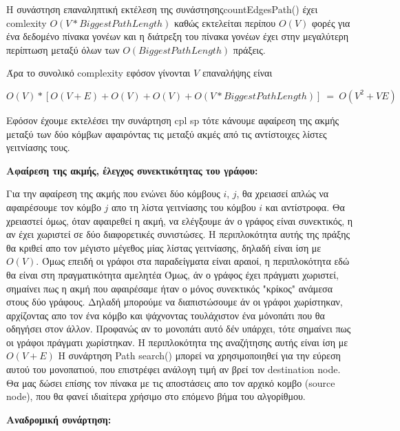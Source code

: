 \documentclass{article}
\begin{document}
Η συνάστηση επαναληπτική εκτέλεση της συνάστησηςcountEdgesPath() έχει comlexity
$O(V*Biggest Path Length)$ καθώς εκτελείται περίπου $Ο(V)$ φορές για ένα δεδομένο πίνακα γονέων και η διάτρεξη του πίνακα γονέων έχει στην μεγαλύτερη περίπτωση μεταξύ όλων των $Ο(Biggest Path Length)$ πράξεις.\bigbreak

Άρα το συνολικό complexity εφόσον γίνονται $V$ επαναλήψης είναι 

$Ο(V) * [O(V+E)+O(V)+O(V)+Ο(V*Biggest Path Length)] \ = \ O(V^2 + VE)$\bigbreak

Eφόσον έχουμε εκτελέσει την συνάρτηση cpl sp τότε κάνουμε αφαίρεση της ακμής μεταξύ των δύο κόμβων αφαιρόντας τις μεταξύ ακμές από τις αντίστοιχες λίστες γειτνίασης τους.\pagebreak

\textbf{Αφαίρεση της ακμής, έλεγχος συνεκτικότητας του γράφου:}\bigbreak

Για την αφαίρεση της ακμής που ενώνει δύο κόμβους $i$, $j$, θα χρειασεί απλώς να αφαιρέσουμε τον κόμβο $j$ απο τη λίστα γειτνίασης του κόμβου $i$ και αντίστροφα.
Θα χρειαστεί όμως, όταν αφαιρεθεί η ακμή, να ελέγξουμε άν ο γράφος είναι συνεκτικός, η αν έχει χωριστεί σε δύο διαφορετικές συνιστώσες. Η περιπλοκότητα αυτής της
πράξης θα κριθεί απο τον μέγιστο μέγεθος μίας λίστας γειτνίασης, δηλαδή είναι ίση με $Ο(V)$. Όμως επειδή οι γράφοι στα παραδείγματα είναι αραιοί, η περιπλοκότητα 
εδώ θα είναι στη πραγματικότητα αμελητέα
Όμως, άν ο γράφος έχει πράγματι χωριστεί, σημαίνει πως η ακμή που αφαιρέσαμε ήταν ο μόνος συνεκτικός "κρίκος" ανάμεσα στους δύο γράφους.
Δηλαδή μπορούμε να διαπιστώσουμε άν οι γράφοι χωρίστηκαν, αρχίζοντας απο τον ένα κόμβο και ψάχνοντας τουλάχιστον ένα μόνοπάτι που θα οδηγήσει στον άλλον.
Προφανώς αν το μονοπάτι αυτό δέν υπάρχει, τότε σημαίνει πως οι γράφοι πράγματι χωρίστηκαν. Η περιπλοκότητα της αναζήτησης αυτής είναι ίση με $Ο(V + Ε)$
Η συνάρτηση Path search() μπορεί να χρησιμοποιηθεί για την εύρεση αυτού του μονοπατιού, που επιστρέφει ανάλογη τιμή αν
βρεί τον destination node. Θα μας δώσει επίσης τον πίνακα με τις αποστάσεις απο τον αρχικό κομβο 
(source node), που θα φανεί ιδιαίτερα χρήσιμο στο επόμενο βήμα του αλγορίθμου.\bigbreak

\textbf{Αναδρομική συνάρτηση:}\bigbreak
\end{document}
